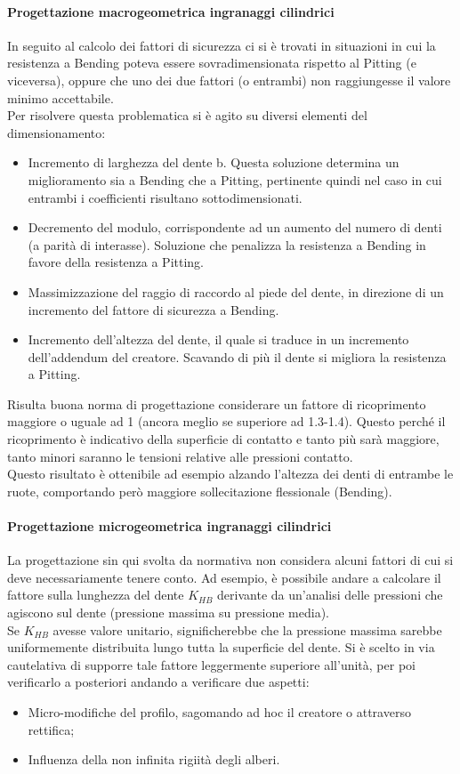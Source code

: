 \paragraph{Progettazione macrogeometrica ingranaggi cilindrici}
In seguito al calcolo dei fattori di sicurezza ci si è trovati in situazioni in cui la resistenza a Bending poteva essere sovradimensionata rispetto al Pitting (e viceversa), oppure che uno dei due fattori (o entrambi) non raggiungesse il valore minimo accettabile.\\
Per risolvere questa problematica si è agito su diversi elementi del dimensionamento:
\begin{itemize}
    \item Incremento di larghezza del dente b. Questa soluzione determina un miglioramento sia a Bending che a Pitting, pertinente quindi nel caso in cui entrambi i coefficienti risultano sottodimensionati. 
    \item Decremento del modulo, corrispondente ad un aumento del numero di denti (a parità di interasse). Soluzione che penalizza la resistenza a Bending in favore della resistenza a Pitting. 
    \item Massimizzazione del raggio di raccordo al piede del dente, in direzione di un incremento del fattore di sicurezza a Bending. 
    \item Incremento dell'altezza del dente, il quale si traduce in un incremento dell'addendum del creatore. Scavando di più il dente si migliora la resistenza a Pitting. 
\end{itemize}
Risulta buona norma di progettazione considerare un fattore di ricoprimento maggiore o uguale ad 1 (ancora meglio se superiore ad 1.3-1.4). Questo perché il ricoprimento è indicativo della superficie di contatto e tanto più sarà maggiore, tanto minori saranno le tensioni relative alle pressioni contatto.\\
Questo risultato è ottenibile ad esempio alzando l'altezza dei denti di entrambe le ruote, comportando però maggiore sollecitazione flessionale (Bending). 
\paragraph{Progettazione microgeometrica ingranaggi cilindrici} La progettazione sin qui svolta da normativa non considera alcuni fattori di cui si deve necessariamente tenere conto. Ad esempio, è possibile andare a calcolare il fattore sulla lunghezza del dente $K_{HB}$ derivante da un'analisi delle pressioni che agiscono sul dente (pressione massima su pressione media).\\
Se $K_{HB}$ avesse valore unitario, significherebbe che la pressione massima sarebbe uniformemente distribuita lungo tutta la superficie del dente. Si è scelto in via cautelativa di supporre tale fattore leggermente superiore all'unità, per poi verificarlo a posteriori andando a verificare due aspetti:
\begin{itemize}
    \item Micro-modifiche del profilo, sagomando ad hoc il creatore o attraverso rettifica;
    \item Influenza della non infinita rigiità degli alberi.
\end{itemize}

